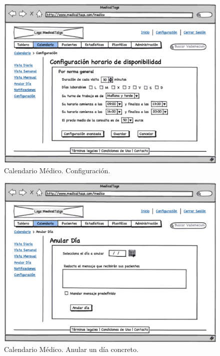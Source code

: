 			
			\begin{figure}[H]
			  \centering
			    \includegraphics[width=12cm]{img/eps/15_Calendario_Medico_Configuracion.eps}
			  \caption{Calendario Médico. Configuración.}
			  \label{fig:calendario_configuracion}
			\end{figure}
			
			\begin{figure}[H]
			  \centering
			    \includegraphics[width=12cm]{img/eps/14_Calendario_Medico_Anular.eps}
			  \caption{Calendario Médico. Anular un día concreto.}
			  \label{fig:calendario_anular_dia}
			\end{figure}
			
